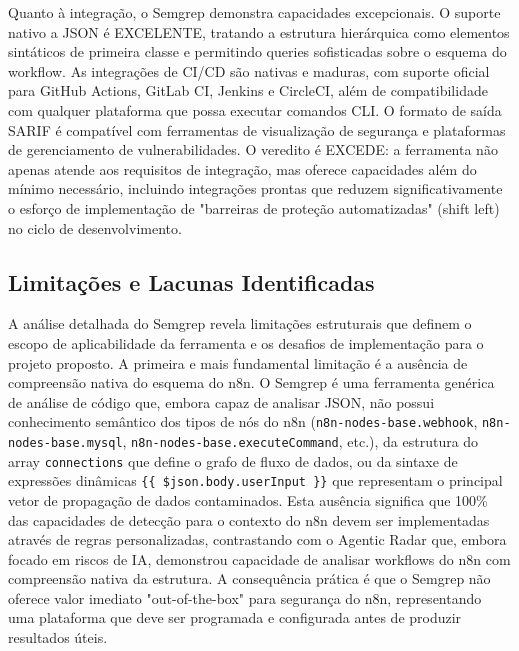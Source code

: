 \documentclass{sftex}
\begin{document}
Quanto à integração, o Semgrep demonstra capacidades excepcionais. O suporte nativo a JSON é EXCELENTE, tratando a estrutura hierárquica como elementos sintáticos de primeira classe e permitindo queries sofisticadas sobre o esquema do workflow. As integrações de CI/CD são nativas e maduras, com suporte oficial para GitHub Actions, GitLab CI, Jenkins e CircleCI, além de compatibilidade com qualquer plataforma que possa executar comandos CLI. O formato de saída SARIF é compatível com ferramentas de visualização de segurança e plataformas de gerenciamento de vulnerabilidades. O veredito é EXCEDE: a ferramenta não apenas atende aos requisitos de integração, mas oferece capacidades além do mínimo necessário, incluindo integrações prontas que reduzem significativamente o esforço de implementação de "barreiras de proteção automatizadas" (shift left) no ciclo de desenvolvimento.

\subsection{Limitações e Lacunas Identificadas}

A análise detalhada do Semgrep revela limitações estruturais que definem o escopo de aplicabilidade da ferramenta e os desafios de implementação para o projeto proposto. A primeira e mais fundamental limitação é a ausência de compreensão nativa do esquema do n8n. O Semgrep é uma ferramenta genérica de análise de código que, embora capaz de analisar JSON, não possui conhecimento semântico dos tipos de nós do n8n (\texttt{n8n-nodes-base.webhook}, \texttt{n8n-nodes-base.mysql}, \texttt{n8n-nodes-base.executeCommand}, etc.), da estrutura do array \texttt{connections} que define o grafo de fluxo de dados, ou da sintaxe de expressões dinâmicas \texttt{\{\{ \$json.body.userInput \}\}} que representam o principal vetor de propagação de dados contaminados. Esta ausência significa que 100\% das capacidades de detecção para o contexto do n8n devem ser implementadas através de regras personalizadas, contrastando com o Agentic Radar que, embora focado em riscos de IA, demonstrou capacidade de analisar workflows do n8n com compreensão nativa da estrutura. A consequência prática é que o Semgrep não oferece valor imediato "out-of-the-box" para segurança do n8n, representando uma plataforma que deve ser programada e configurada antes de produzir resultados úteis.
\end{document}
